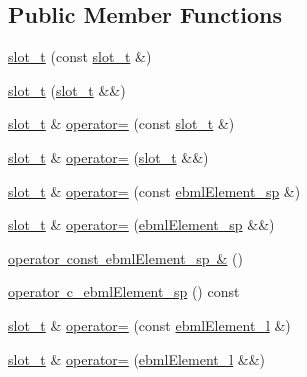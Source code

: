 \subsection*{Public Member Functions}
\begin{DoxyCompactItemize}
\item 
\mbox{\hyperlink{classebml_1_1slot__t_a9eafcb1c7713718640339c65db36397d}{slot\+\_\+t}} (const \mbox{\hyperlink{classebml_1_1slot__t}{slot\+\_\+t}} \&)
\item 
\mbox{\hyperlink{classebml_1_1slot__t_a76551cd306d702fbce48749e32187fc9}{slot\+\_\+t}} (\mbox{\hyperlink{classebml_1_1slot__t}{slot\+\_\+t}} \&\&)
\item 
\mbox{\hyperlink{classebml_1_1slot__t}{slot\+\_\+t}} \& \mbox{\hyperlink{classebml_1_1slot__t_a691156a7c8cbe2ffadf29255e7e30615}{operator=}} (const \mbox{\hyperlink{classebml_1_1slot__t}{slot\+\_\+t}} \&)
\item 
\mbox{\hyperlink{classebml_1_1slot__t}{slot\+\_\+t}} \& \mbox{\hyperlink{classebml_1_1slot__t_a81a4b0f463d89955119880b9f15d1fd1}{operator=}} (\mbox{\hyperlink{classebml_1_1slot__t}{slot\+\_\+t}} \&\&)
\item 
\mbox{\hyperlink{classebml_1_1slot__t}{slot\+\_\+t}} \& \mbox{\hyperlink{classebml_1_1slot__t_a3978ca348f4b1a0c4b9f0287c394e1a4}{operator=}} (const \mbox{\hyperlink{namespaceebml_adad533b7705a16bb360fe56380c5e7be}{ebml\+Element\+\_\+sp}} \&)
\item 
\mbox{\hyperlink{classebml_1_1slot__t}{slot\+\_\+t}} \& \mbox{\hyperlink{classebml_1_1slot__t_ac3df4ed7828ec3b59cc608aa1be89ff3}{operator=}} (\mbox{\hyperlink{namespaceebml_adad533b7705a16bb360fe56380c5e7be}{ebml\+Element\+\_\+sp}} \&\&)
\item 
\mbox{\hyperlink{classebml_1_1slot__t_a89f3135580818ad0797c74baee65197d}{operator const ebml\+Element\+\_\+sp \&}} ()
\item 
\mbox{\hyperlink{classebml_1_1slot__t_aec1d933d5142acc72f3af01eb48d9353}{operator c\+\_\+ebml\+Element\+\_\+sp}} () const
\item 
\mbox{\hyperlink{classebml_1_1slot__t}{slot\+\_\+t}} \& \mbox{\hyperlink{classebml_1_1slot__t_a79517bf5358ba5c6f10a051a9073a340}{operator=}} (const \mbox{\hyperlink{namespaceebml_a1ddadd26791f273d851882653b9caf70}{ebml\+Element\+\_\+l}} \&)
\item 
\mbox{\hyperlink{classebml_1_1slot__t}{slot\+\_\+t}} \& \mbox{\hyperlink{classebml_1_1slot__t_a27b1914f5101516ef38491dcec55c30b}{operator=}} (\mbox{\hyperlink{namespaceebml_a1ddadd26791f273d851882653b9caf70}{ebml\+Element\+\_\+l}} \&\&)

\end{DoxyCompactItemize}
